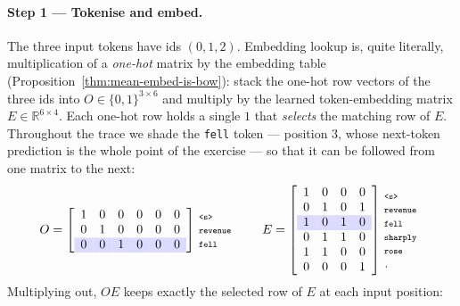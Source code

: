 \begin{deepdive}
\paragraph{Step 1 --- Tokenise and embed.}
The three input tokens have ids $(0, 1, 2)$.  Embedding lookup is, quite literally,
multiplication of a \emph{one-hot} matrix by the embedding table
(Proposition~\ref{thm:mean-embed-is-bow}): stack the one-hot row vectors of the three
ids into $O \in \{0,1\}^{3 \times 6}$ and multiply by the learned token-embedding
matrix $E \in \mathbb{R}^{6 \times 4}$.  Each one-hot row holds a single $1$ that
\emph{selects} the matching row of $E$.  Throughout the trace we shade the
\texttt{fell} token --- position $3$, whose next-token prediction is the whole point of
the exercise --- so that it can be followed from one matrix to the next:
\begin{equation*}
  O =
  \left[\begin{array}{cccccc}
    1 & 0 & 0 & 0 & 0 & 0\\
    0 & 1 & 0 & 0 & 0 & 0\\
    \rowcolor{blue!14} 0 & 0 & 1 & 0 & 0 & 0
  \end{array}\right]\!\!
  \begin{array}{l}
    \scriptstyle\texttt{<s>}\\[-1pt]\scriptstyle\texttt{revenue}\\[-1pt]
    \scriptstyle\texttt{fell}
  \end{array}
  \qquad
  E =
  \left[\begin{array}{cccc}
    1 & 0 & 0 & 0\\
    0 & 1 & 0 & 1\\
    \rowcolor{blue!14} 1 & 0 & 1 & 0\\
    0 & 1 & 1 & 0\\
    1 & 1 & 0 & 0\\
    0 & 0 & 0 & 1
  \end{array}\right]\!\!
  \begin{array}{l}
    \scriptstyle\texttt{<s>}\\[-1pt]\scriptstyle\texttt{revenue}\\[-1pt]
    \scriptstyle\texttt{fell}\\[-1pt]\scriptstyle\texttt{sharply}\\[-1pt]
    \scriptstyle\texttt{rose}\\[-1pt]\scriptstyle\texttt{.}
  \end{array}
\end{equation*}
Multiplying out, $O E$ keeps exactly the selected row of $E$ at each input position:

\end{deepdive}
